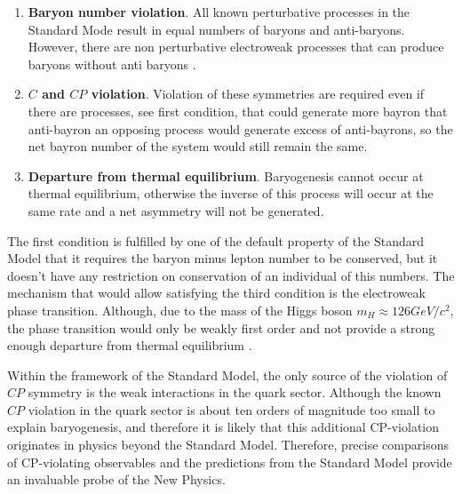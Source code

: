 \begin{enumerate}
    \item \textbf{Baryon number violation}.  All known perturbative processes in the Standard Mode result in equal numbers of baryons and anti-baryons. However, there are non perturbative electroweak processes that can produce baryons without anti baryons \cite{bayron_number_violation}. 
    \item \textbf{$C$ and $CP$ violation}. Violation of these symmetries are required even if there are processes, see first condition, that could generate more bayron that anti-bayron an opposing process would generate excess of anti-bayrons, so the net bayron number of the system would still remain the same.
    \item \textbf{Departure from thermal equilibrium}. Baryogenesis cannot occur at thermal equilibrium, otherwise the inverse of this process  will occur at the same rate and a net asymmetry will not be generated.
\end{enumerate}

The first condition is fulfilled by one of the default property of the Standard Model that it requires the baryon minus lepton number to be conserved, but it doesn't have any restriction on conservation of an individual of this numbers.  The mechanism that would allow satisfying the third condition is the electroweak phase transition. Although, due to the mass of the Higgs boson $m_H \approx 126 GeV/c^{2}$, the phase transition would only be weakly first order and not provide a strong enough departure from thermal equilibrium \cite{phase_transiton}. 

 Within the framework of the Standard Model, the only source of the violation of $CP$ symmetry is the weak interactions in the quark sector. Although the known $CP$ violation in the quark sector is about ten orders of magnitude too small to explain baryogenesis, and therefore it is likely that this additional CP-violation originates in physics beyond the Standard Model. Therefore, precise comparisons of CP-violating observables and the predictions from the Standard Model provide an invaluable probe of the New Physics.